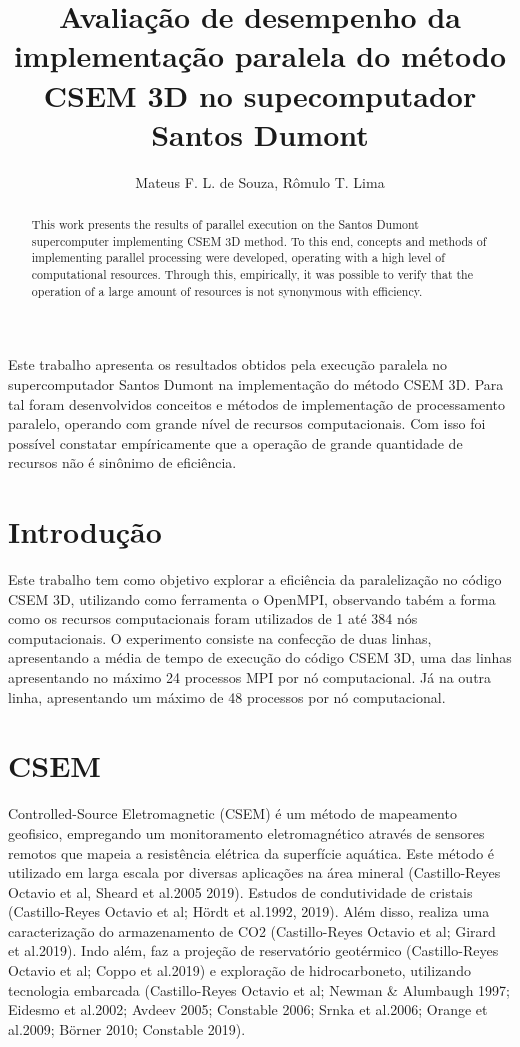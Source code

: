 \documentclass[12pt]{article}
\title{Avaliação de desempenho da implementação paralela do método CSEM 3D no supecomputador Santos Dumont}
\author{Mateus F. L. de Souza\inst{1,2}, Rômulo T. Lima\inst{1,3}}
\begin{document}
 

\maketitle

\begin{abstract}
  This work presents the results of parallel execution on the Santos Dumont supercomputer implementing CSEM 3D method. To this end, concepts and methods of implementing parallel processing were developed, operating with a high level of computational resources. Through this,  empirically, it was possible  to verify that the operation of a large amount of resources is not synonymous with efficiency.
\end{abstract}
     
\begin{resumo} 
  Este trabalho apresenta os resultados obtidos pela execução paralela no supercomputador Santos Dumont na implementação do método CSEM 3D. Para tal foram desenvolvidos conceitos e métodos de implementação de processamento paralelo, operando com grande nível de recursos computacionais. Com isso foi possível constatar empíricamente que a operação de grande quantidade de recursos não é sinônimo de eficiência.
\end{resumo}

\section{Introdução}
Este trabalho tem como objetivo explorar a eficiência da paralelização no código CSEM 3D, utilizando como ferramenta o OpenMPI, observando tabém a forma como os recursos computacionais foram utilizados de 1 até 384 nós computacionais. O experimento consiste na confecção de duas linhas, apresentando a média de tempo de execução do código CSEM 3D, uma das linhas apresentando no máximo 24 processos MPI por nó computacional. Já na outra linha, apresentando um máximo de 48 processos por nó computacional.

\section{CSEM} \label{sec:firstpage}
Controlled-Source Eletromagnetic (CSEM) é um método de mapeamento geofisico, empregando um monitoramento eletromagnético através de sensores remotos que mapeia a resistência elétrica da superfície aquática. Este método é utilizado em larga escala por diversas aplicações na área mineral (Castillo-Reyes
Octavio et al, Sheard et al.2005 2019). Estudos de condutividade de cristais (Castillo-Reyes
Octavio et al; Hördt et al.1992, 2019). Além disso, realiza uma caracterização do armazenamento de CO2 (Castillo-Reyes
Octavio et al; Girard et al.2019). Indo além, faz a projeção de reservatório geotérmico (Castillo-Reyes
Octavio et al; Coppo et al.2019) e exploração de hidrocarboneto, utilizando tecnologia embarcada (Castillo-Reyes
Octavio et al; Newman \& Alumbaugh 1997; Eidesmo et al.2002; Avdeev 2005; Constable 2006; Srnka et al.2006; Orange et al.2009; Börner 2010; Constable 2019). 
\end{document}
